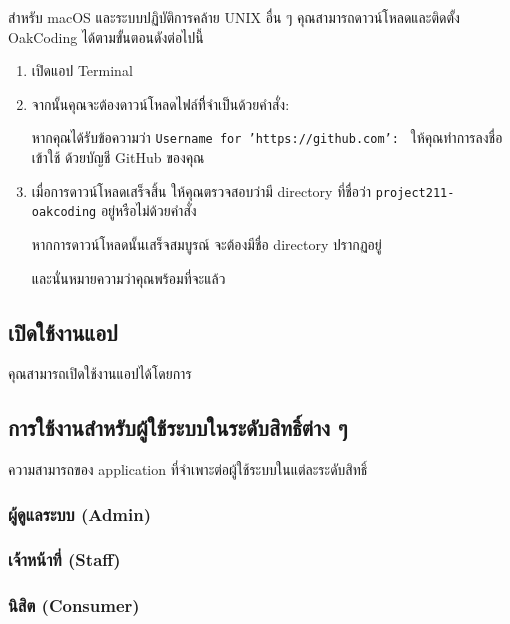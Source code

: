 \rule{0em}{1ex}

สำหรับ macOS และระบบปฏิบัติการคล้าย UNIX อื่น ๆ คุณสามารถดาวน์โหลด\linebreak[3] \mbox{และติดตั้ง} OakCoding ได้ตามขั้นตอนดังต่อไปนี้

\begin{enumerate}
\setlength{\itemsep}{0.7pt}
    \item เปิดแอป Terminal


    \item จากนั้นคุณจะต้องดาวน์โหลดไฟล์ทีี่จำเป็นด้วยคำสั่ง:


    หากคุณได้รับข้อความว่า \texttt{Username for 'https://github.com': } ให้คุณทำการลงชื่อเข้าใช้
    ด้วยบัญชี GitHub ของคุณ

    \item เมื่อการดาวน์โหลดเสร็จสิ้น ให้คุณตรวจสอบว่ามี directory ที่ชื่อว่า \mbox{\texttt{project211-oakcoding}} อยู่หรือไม่ด้วยคำสั่ง


    หากการดาวน์โหลดนั้นเสร็จสมบูรณ์ จะต้องมีชื่อ directory ปรากฏอยู่


    และนั่นหมายความว่าคุณพร้อมที่จะแล้ว
\end{enumerate}

\clearpage

\subsection{เปิดใช้งานแอป}
\label{subsec:launch-app}

\rule{0em}{1ex}

คุณสามารถเปิดใช้งานแอปได้โดยการ

\subsection{การใช้งานสำหรับผู้ใช้ระบบในระดับสิทธิ์ต่าง ๆ}
ความสามารถของ application ที่จำเพาะต่อผู้ใช้ระบบในแต่ละระดับสิทธิ์

\subsubsection{ผู้ดูแลระบบ (Admin)}
\noindent\blindtext[3]

\subsubsection{เจ้าหน้าที่ (Staff)}
\noindent\blindtext[3]

\subsubsection{นิสิต (Consumer)}
\noindent\blindtext[3]
